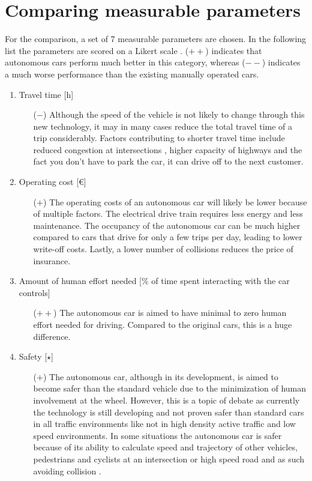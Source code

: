\documentclass[a4paper]{article}
\begin{document}
\section{Comparing measurable parameters}
\label{sec:comparing}

For the comparison, a set of 7 measurable parameters are chosen. In the following list the parameters are scored on a Likert scale \cite{likert}. ($++$) indicates that autonomous cars perform much better in this category, whereas ($--$) indicates a much worse performance than the existing manually operated cars.

\begin{enumerate}
\item Travel time [h]
    \begin{enumerate}
    \item[($-$)] Although the speed of the vehicle is not likely to change through this new technology, it may in many cases reduce the total travel time of a trip considerably. Factors contributing to shorter travel time include reduced congestion at intersections \cite{IROS12-chiu}, higher capacity of highways \cite{GONG201825} and the fact you don't have to park the car, it can drive off to the next customer.
    \end{enumerate}
\item Operating cost [€]
    \begin{enumerate}
    \item[($+$)] The operating costs of an autonomous car will likely be lower because of multiple factors. The electrical drive train requires less energy and less maintenance. The occupancy of the autonomous car can be much higher compared to cars that drive for only a few trips per day, leading to lower write-off costs. Lastly, a lower number of collisions reduces the price of insurance.
    \end{enumerate}
\item Amount of human effort needed [\% of time spent interacting with the car controls]
    \begin{enumerate}
    \item[($++$)] The autonomous car is aimed to have minimal to zero human effort needed for driving. Compared to the original cars, this is a huge difference.
    \end{enumerate}
\item Safety [$\star$]
    \begin{enumerate}
    \item[($+$)] The autonomous car, although in its development, is aimed to become safer than the standard vehicle due to the minimization of human involvement at the wheel. However, this is a topic of debate as currently the technology is still developing and not proven safer than standard cars in all traffic environments like not in high density active traffic and low speed environments. In some situations the autonomous car is safer because of its ability to calculate speed and trajectory of other vehicles, pedestrians and cyclists at an intersection or high speed road and as such avoiding collision \cite{FU2018188}.

\end{enumerate}
\end{enumerate}
\end{document}
